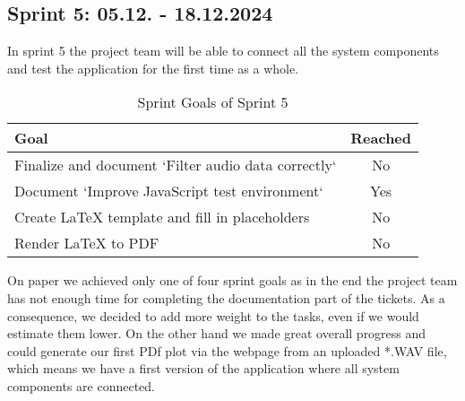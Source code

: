 \subsection{Sprint 5: 05.12. - 18.12.2024}\label{subsec:sprint-5}
In sprint 5 the project team will be able to connect all the system components and test the application for the first time as a whole.
\begin{table}[H]
    \centering
    \begin{tabularx}{\textwidth}{X c}
        \toprule
        \textbf{Goal}                                         & \textbf{Reached} \\
        \midrule
        Finalize and document `Filter audio data correctly`   & No               \\
        \midrule
        Document `Improve JavaScript test environment`        & Yes              \\
        \midrule
        Create LaTeX template and fill in placeholders        & No               \\
        \midrule
        Render LaTeX to PDF                                   & No               \\
        \bottomrule
    \end{tabularx}
    \caption{Sprint Goals of Sprint 5}\label{tab:sprint_goals5}
\end{table}
On paper we achieved only one of four sprint goals as in the end the project team has not enough time for completing
the documentation part of the tickets.
As a consequence, we decided to add more weight to the tasks, even if we would estimate them lower.
On the other hand we made great overall progress and could generate our first PDf plot via the webpage from an uploaded
*.WAV  file, which means we have a first version of the application where all system components are connected.

